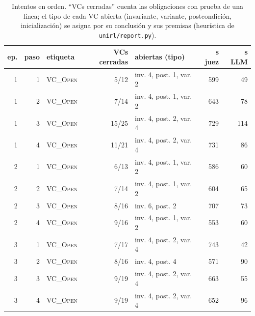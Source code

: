 \documentclass[11pt,a4paper]{article}
\begin{document}
\begin{table}[!ht]
\centering
\footnotesize
\begin{tabular}{@{}rrlrlrr@{}}
\toprule
ep. & paso & etiqueta & VCs cerradas & abiertas (tipo) & s juez & s LLM \\
\midrule
1 & 1 & \textsc{VC\_Open} & 5/12 & inv. 4, post. 1, var. 2 & 599 & 49 \\
1 & 2 & \textsc{VC\_Open} & 7/14 & inv. 4, post. 1, var. 2 & 643 & 78 \\
1 & 3 & \textsc{VC\_Open} & 15/25 & inv. 4, post. 2, var. 4 & 729 & 114 \\
1 & 4 & \textsc{VC\_Open} & 11/21 & inv. 4, post. 2, var. 4 & 731 & 86 \\
2 & 1 & \textsc{VC\_Open} & 6/13 & inv. 4, post. 1, var. 2 & 586 & 60 \\
2 & 2 & \textsc{VC\_Open} & 7/14 & inv. 4, post. 1, var. 2 & 604 & 65 \\
2 & 3 & \textsc{VC\_Open} & 8/16 & inv. 6, post. 2 & 707 & 73 \\
2 & 4 & \textsc{VC\_Open} & 9/16 & inv. 4, post. 1, var. 2 & 553 & 60 \\
3 & 1 & \textsc{VC\_Open} & 7/17 & inv. 4, post. 2, var. 4 & 743 & 42 \\
3 & 2 & \textsc{VC\_Open} & 8/16 & inv. 4, post. 4 & 571 & 90 \\
3 & 3 & \textsc{VC\_Open} & 9/19 & inv. 4, post. 2, var. 4 & 663 & 55 \\
3 & 4 & \textsc{VC\_Open} & 9/19 & inv. 4, post. 2, var. 4 & 652 & 96 \\
\bottomrule
\end{tabular}
\caption{Intentos en orden. ``VCs cerradas'' cuenta las obligaciones con prueba de una línea; el tipo de cada VC abierta (invariante, variante, postcondición, inicialización) se asigna por su conclusión y sus premisas (heurística de \texttt{unirl/report.py}).}
\label{tab:intentos-bisection_isabelle-0}
\end{table}
\end{document}
